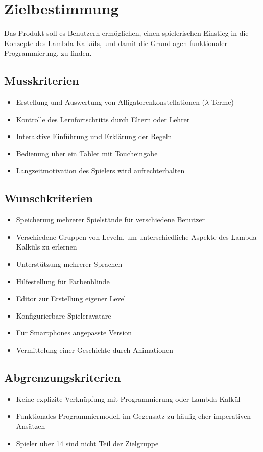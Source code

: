 \section{Zielbestimmung}
Das Produkt soll es Benutzern ermöglichen, einen spielerischen Einstieg in die Konzepte des Lambda-Kalküls, und damit die Grundlagen funktionaler Programmierung, zu finden.

\subsection{Musskriterien}

\begin{itemize}
	\item Erstellung und Auswertung von Alligatorenkonstellationen (\(\lambda\)-Terme)
	\item Kontrolle des Lernfortschritts durch Eltern oder Lehrer
	\item Interaktive Einführung und Erklärung der Regeln
	\item Bedienung über ein Tablet mit Toucheingabe
	\item Langzeitmotivation des Spielers wird aufrechterhalten
\end{itemize}


\subsection{Wunschkriterien}

\begin{itemize}
	\item Speicherung mehrerer Spielstände für verschiedene Benutzer
	\item Verschiedene Gruppen von Leveln, um unterschiedliche Aspekte des Lambda-Kalküls zu erlernen
	\item Unterstützung mehrerer Sprachen
	\item Hilfestellung für Farbenblinde
	\item Editor zur Erstellung eigener Level
	\item Konfigurierbare Spieleravatare
	\item Für Smartphones angepasste Version
	\item Vermittelung einer Geschichte durch Animationen
\end{itemize}


\subsection{Abgrenzungskriterien}

\begin{itemize}
	\item Keine explizite Verknüpfung mit Programmierung oder Lambda-Kalkül
	\item Funktionales Programmiermodell im Gegensatz zu häufig eher imperativen Ansätzen
	\item Spieler über 14 sind nicht Teil der Zielgruppe
\end{itemize}

